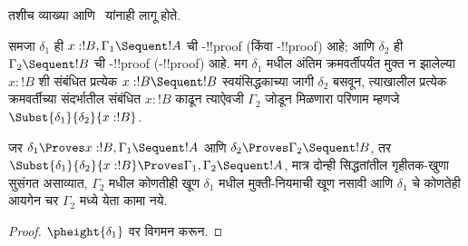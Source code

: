 \documentclass[../../../include/open-logic-section]{subfiles}
\begin{document}
तशीच व्याख्या
 आणि~
यांनाही लागू होते.

\begin{defn}
समजा $\delta_1$ ही
$x:!B, \Gamma_1 \Sequent !A$
ची -!!{proof}
(किंवा -!!{proof}) आहे;
आणि $\delta_2$ ही
$\Gamma_2 \Sequent !B$
ची -!!{proof}
(-!!{proof}) आहे.
मग $\delta_1$ मधील
अंतिम क्रमवर्तीपर्यंत मुक्त न झालेल्या
$x:!B$ शी संबंधित प्रत्येक $x:!B \Sequent !B$
स्वयंसिद्धकाच्या जागी $\delta_2$ बसवून,
त्याखालील प्रत्येक क्रमवर्तीच्या संदर्भातील
संबंधित $x:!B$ काढून त्याऐवजी $\Gamma_2$ जोडून
मिळणारा परिणाम म्हणजे
$\Subst{\delta_1}{\delta_2}{x:!B}$.
\end{defn}

\begin{prop}
जर $\delta_1 \Proves
x:!B, \Gamma_1 \Sequent
!A$ आणि $\delta_2 \Proves
\Gamma_2 \Sequent !B$,
तर $\Subst{\delta_1}{\delta_2}{x:!B}
\Proves \Gamma_1, \Gamma_2 \Sequent
!A$, मात्र दोन्ही सिद्धतांतील गृहीतक-खुणा सुसंगत असाव्यात,
$\Gamma_2$ मधील कोणतीही खूण $\delta_1$ मधील
मुक्ती-नियमाची खूण नसावी आणि $\delta_1$ चे
कोणतेही आयगेन चर $\Gamma_2$ मध्ये येता कामा नये.
\end{prop}

\begin{proof}
  $\pheight{\delta_1}$ वर
  विगमन करून.
\end{proof}
\end{document}
